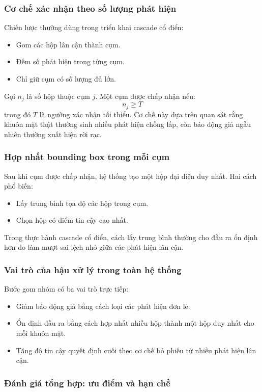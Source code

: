 \subsubsection{Cơ chế xác nhận theo số lượng phát hiện}

Chiến lược thường dùng trong triển khai cascade cổ điển:
\begin{itemize}
  \item Gom các hộp lân cận thành cụm.
  \item Đếm số phát hiện trong từng cụm.
  \item Chỉ giữ cụm có số lượng đủ lớn.
\end{itemize}
Gọi $n_j$ là số hộp thuộc cụm $j$.
Một cụm được chấp nhận nếu:
\[
n_j \ge T
\]
trong đó $T$ là ngưỡng xác nhận tối thiểu.
Cơ chế này dựa trên quan sát rằng khuôn mặt thật thường sinh nhiều phát hiện chồng lấp, còn báo động giả ngẫu nhiên thường xuất hiện rời rạc.

\subsubsection{Hợp nhất bounding box trong mỗi cụm}

Sau khi cụm được chấp nhận, hệ thống tạo một hộp đại diện duy nhất.
Hai cách phổ biến:
\begin{itemize}
  \item Lấy trung bình tọa độ các hộp trong cụm.
  \item Chọn hộp có điểm tin cậy cao nhất.
\end{itemize}
Trong thực hành cascade cổ điển, cách lấy trung bình thường cho đầu ra ổn định hơn do làm mượt sai lệch nhỏ giữa các phát hiện lân cận.

\subsubsection{Vai trò của hậu xử lý trong toàn hệ thống}

Bước gom nhóm có ba vai trò trực tiếp:
\begin{itemize}
  \item Giảm báo động giả bằng cách loại các phát hiện đơn lẻ.
  \item Ổn định đầu ra bằng cách hợp nhất nhiều hộp thành một hộp duy nhất cho mỗi khuôn mặt.
  \item Tăng độ tin cậy quyết định cuối theo cơ chế bỏ phiếu từ nhiều phát hiện lân cận.
\end{itemize}

\subsubsection{Đánh giá tổng hợp: ưu điểm và hạn chế}

